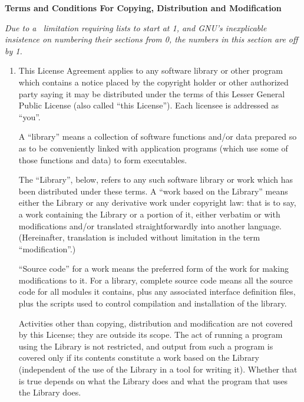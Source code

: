 {\medskip\noindent\normalsize\textbf{Terms and Conditions For Copying, Distribution and Modification}}
{\scriptsize

\begin{multicols}{2}

\ifhevea \emph{Due to a \hevea\ limitation requiring lists to start at 1, and 
GNU's inexplicable insistence on numbering their sections from 0, the numbers in 
this section are off by 1.}\fi

\begin{enumerate}

\ifhevea\else\addtocounter{enumi}{-1}\fi

\item
This License Agreement applies to any software library or other program which 
contains a notice placed by the copyright holder or other authorized party 
saying it may be distributed under the terms of this Lesser General Public 
License (also called ``this License''). Each licensee is addressed as ``you''.

A ``library'' means a collection of software functions and/or data prepared so as 
to be conveniently linked with application programs (which use some of those 
functions and data) to form executables.

The ``Library'', below, refers to any such software library or work which has been 
distributed under these terms. A ``work based on the Library'' means either the 
Library or any derivative work under copyright law: that is to say, a work 
containing the Library or a portion of it, either verbatim or with modifications 
and/or translated straightforwardly into another language. (Hereinafter, 
translation is included without limitation in the term ``modification''.)

``Source code'' for a work means the preferred form of the work for making 
modifications to it. For a library, complete source code means all the source 
code for all modules it contains, plus any associated interface definition 
files, plus the scripts used to control compilation and installation of the 
library.

Activities other than copying, distribution and modification are not covered by 
this License; they are outside its scope. The act of running a program using the 
Library is not restricted, and output from such a program is covered only if its 
contents constitute a work based on the Library (independent of the use of the 
Library in a tool for writing it). Whether that is true depends on what the 
Library does and what the program that uses the Library does. 


\end{enumerate}
\end{multicols}}

